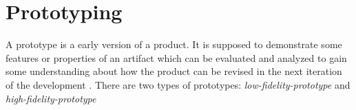 \documentclass[../Main/thesis.tex]{subfiles}
\begin{document}


\section{Prototyping}
A prototype is a early version of a product. 
It is supposed to demonstrate some features or properties of an artifact which can be evaluated and analyzed to gain some understanding about how the product can be revised in the next iteration of the development \citep{oates2005researching}.
There are two types of prototypes: \textit{low-fidelity-prototype} and \textit{high-fidelity-prototype}
\end{document}
